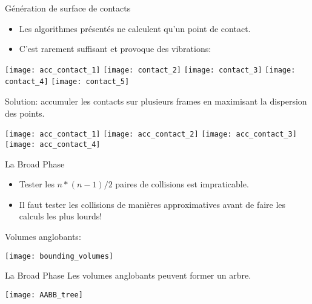 \begin{frame}{Génération de surface de contacts}
    \begin{itemize}
        \item Les algorithmes présentés ne calculent qu’un point de contact.
        \item C’est rarement suffisant et provoque des vibrations:
    \end{itemize}
    \begin{center}
        \texttt{[image: acc\_contact\_1]}
        \pause
        \texttt{[image: contact\_2]}
        \pause
        \texttt{[image: contact\_3]}
        \pause
        \texttt{[image: contact\_4]}
        \pause
        \texttt{[image: contact\_5]}
        \pause
    \end{center}

    Solution: accumuler les contacts sur plusieurs frames en maximisant la
    dispersion des points.
    \pause
    \begin{center}
        \texttt{[image: acc\_contact\_1]}
        \pause
        \texttt{[image: acc\_contact\_2]}
        \pause
        \texttt{[image: acc\_contact\_3]}
        \pause
        \texttt{[image: acc\_contact\_4]}
    \end{center}
\end{frame}

\begin{frame}{La Broad Phase}
    \begin{itemize}
        \item Tester les $n * (n - 1) / 2$ paires de collisions est impraticable.
        \item Il faut tester les collisions de manières approximatives avant de
            faire les calculs les plus lourds!
    \end{itemize}
    \pause
    \begin{description}
        \item[Volumes anglobants:]
    \end{description}
    \begin{center}
        \texttt{[image: bounding\_volumes]}
    \end{center}
\end{frame}

\begin{frame}{La Broad Phase}
    Les volumes anglobants peuvent former un arbre.
    \begin{center}
            \texttt{[image: AABB\_tree]}
    \end{center}
\end{frame}

